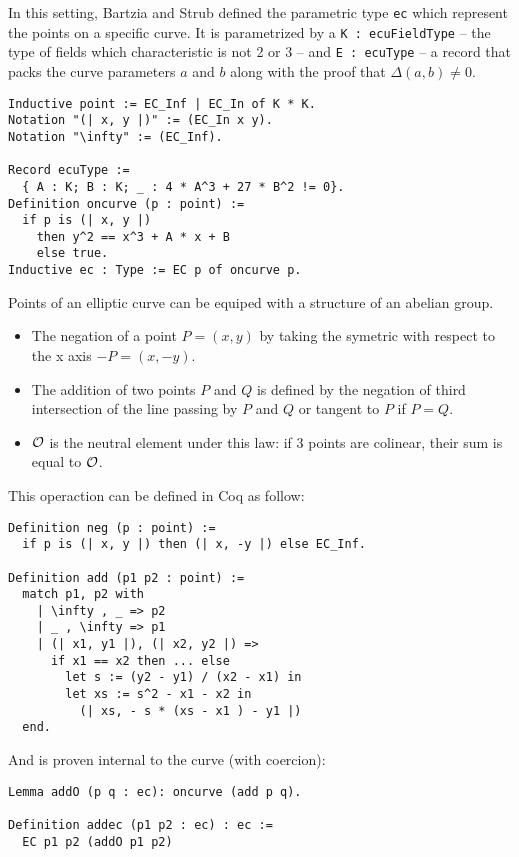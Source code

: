 In this setting, Bartzia and Strub defined the parametric type \texttt{ec} which
represent the points on a specific curve. It is parametrized by
a \texttt{K : ecuFieldType} -- the type of fields which characteristic is not 2 or 3 --
and \texttt{E : ecuType} -- a record that packs the curve parameters $a$ and $b$
along with the proof that $\Delta(a,b) \neq 0$.
\begin{lstlisting}[language=Coq]
Inductive point := EC_Inf | EC_In of K * K.
Notation "(| x, y |)" := (EC_In x y).
Notation "\infty" := (EC_Inf).

Record ecuType :=
  { A : K; B : K; _ : 4 * A^3 + 27 * B^2 != 0}.
Definition oncurve (p : point) :=
  if p is (| x, y |)
    then y^2 == x^3 + A * x + B
    else true.
Inductive ec : Type := EC p of oncurve p.
\end{lstlisting}

Points of an elliptic curve can be equiped with a structure of an abelian group.
\begin{itemize}
  \item The negation of a point $P = (x,y)$ by taking the symetric with respect to the x axis $-P = (x, -y)$.
  \item The addition of two points $P$ and $Q$ is defined by the negation of third intersection
  of the line passing by $P$ and $Q$ or tangent to $P$ if $P = Q$.
  \item $\mathcal{O}$ is the neutral element under this law: if 3 points are colinear, their sum is equal to $\mathcal{O}$.
\end{itemize}

This operaction can be defined in Coq as follow:
\begin{lstlisting}[language=Coq]
Definition neg (p : point) :=
  if p is (| x, y |) then (| x, -y |) else EC_Inf.

Definition add (p1 p2 : point) :=
  match p1, p2 with
    | \infty , _ => p2
    | _ , \infty => p1
    | (| x1, y1 |), (| x2, y2 |) =>
      if x1 == x2 then ... else
        let s := (y2 - y1) / (x2 - x1) in
        let xs := s^2 - x1 - x2 in
          (| xs, - s * (xs - x1 ) - y1 |)
  end.
\end{lstlisting}

And is proven internal to the curve (with coercion):
\begin{lstlisting}[language=Coq]
Lemma addO (p q : ec): oncurve (add p q).

Definition addec (p1 p2 : ec) : ec :=
  EC p1 p2 (addO p1 p2)
\end{lstlisting}

